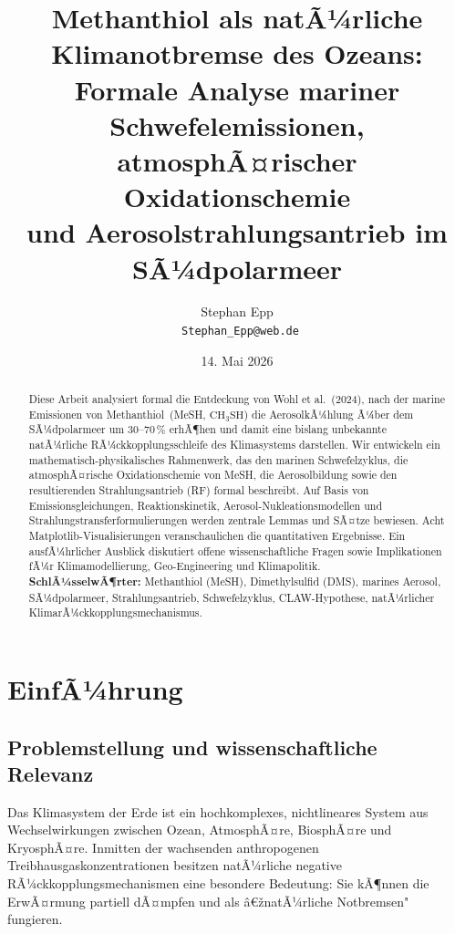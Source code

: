 ﻿\documentclass[a4paper,12pt]{article}
\title{\textbf{Methanthiol als natÃ¼rliche Klimanotbremse des Ozeans:}\\
\large Formale Analyse mariner Schwefelemissionen, atmosphÃ¤rischer Oxidationschemie\\
und Aerosolstrahlungsantrieb im SÃ¼dpolarmeer}
\author{Stephan Epp\\
\
\small \texttt{Stephan\_Epp@web.de}}
\date{14. Mai 2026}
\theoremstyle{definition}
\begin{document}
\maketitle

\begin{abstract}
Diese Arbeit analysiert formal die Entdeckung von Wohl et al.~(2024), nach der marine Emissionen von
Methanthiol~(MeSH, \(\mathrm{CH_3SH}\)) die AerosolkÃ¼hlung Ã¼ber dem SÃ¼dpolarmeer um 30--70\,\%
erhÃ¶hen und damit eine bislang unbekannte natÃ¼rliche RÃ¼ckkopplungsschleife des Klimasystems
darstellen. Wir entwickeln ein mathematisch-physikalisches Rahmenwerk, das den marinen
Schwefelzyklus, die atmosphÃ¤rische Oxidationschemie von MeSH, die Aerosolbildung sowie den
resultierenden Strahlungsantrieb (RF) formal beschreibt. Auf Basis von Emissionsgleichungen,
Reaktionskinetik, Aerosol-Nukleationsmodellen und Strahlungstransferformulierungen werden zentrale
Lemmas und SÃ¤tze bewiesen. Acht Matplotlib-Visualisierungen veranschaulichen die quantitativen
Ergebnisse. Ein ausfÃ¼hrlicher Ausblick diskutiert offene wissenschaftliche Fragen sowie
Implikationen fÃ¼r Klimamodellierung, Geo-Engineering und Klimapolitik.\\[0.4em]
\textbf{SchlÃ¼sselwÃ¶rter:} Methanthiol (MeSH), Dimethylsulfid (DMS), marines Aerosol, SÃ¼dpolarmeer,
Strahlungsantrieb, Schwefelzyklus, CLAW-Hypothese, natÃ¼rlicher KlimarÃ¼ckkopplungsmechanismus.
\end{abstract}

\tableofcontents
\newpage

\section{EinfÃ¼hrung}

\subsection{Problemstellung und wissenschaftliche Relevanz}

Das Klimasystem der Erde ist ein hochkomplexes, nichtlineares System aus Wechselwirkungen zwischen
Ozean, AtmosphÃ¤re, BiosphÃ¤re und KryosphÃ¤re. Inmitten der wachsenden anthropogenen Treibhausgaskonzentrationen
besitzen natÃ¼rliche negative RÃ¼ckkopplungsmechanismen eine besondere Bedeutung: Sie kÃ¶nnen die
ErwÃ¤rmung partiell dÃ¤mpfen und als â€žnatÃ¼rliche Notbremsen" fungieren.
\end{document}
